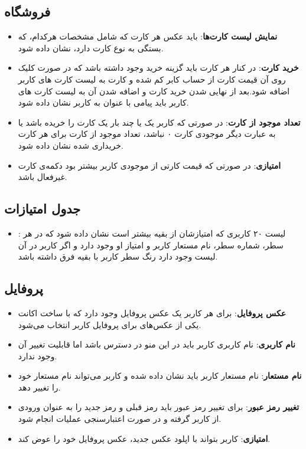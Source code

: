 \documentclass[]{article}
\begin{document}
\subsection*{{\titr فروشگاه}}

\begin{itemize}
    \item \textbf{نمایش لیست کارت‌ها}: باید عکس هر کارت که شامل مشخصات هر‌کدام، که بستگی به نوع کارت دارد، نشان داده شود.
    \item \textbf{خرید کارت}: در کنار هر کارت باید گزینه خرید وجود داشته باشد که در صورت کلیک روی آن قیمت کارت از حساب کابر کم شده و کارت به لیست کارت های کاربر اضافه شود.بعد از نهایی شدن خرید کارت و اضافه شدن آن به لیست کارت های کاربر باید پیامی با عنوان   به کاربر نشان داده شود.
    \item \textbf{تعداد موجود از کارت}: در صورتی که کاربر یک یا چند بار یک کارت را خریده باشد یا به عبارت دیگر موجودی کارت ۰ نباشد، تعداد موجود از کارت برای هر کارت خریداری شده نشان داده شود.
    \item \textbf{امتیازی}: در صورتی که قیمت کارتی از موجودی کاربر بیشتر بود دکمه‌ی  کارت غیر‌فعال باشد.
\end{itemize}

\subsection*{{\titr جدول امتیازات}}

\begin{itemize}
    \item {}:  لیست ۲۰ کاربری که امتیازشان از بقیه بیشتر است نشان داده شود که در هر سطر، شماره سطر،  نام مستعار کاربر و امتیاز او وجود دارد و اگر کاربر در آن لیست وجود دارد رنگ سطر کاربر با بقیه فرق داشته باشد.
\end{itemize}


\subsection*{{\titr پروفایل}}
\begin{itemize}
    \item \textbf{عکس پروفایل}: برای هر کاربر یک عکس پروفایل وجود دارد که با ساخت اکانت یکی از عکس‌های  برای پروفایل کاربر انتخاب می‌شود.
    \item \textbf{نام کاربری}: نام کاربری کاربر باید در این منو در دسترس باشد اما قابلیت تغییر آن وجود ندارد.
    \item \textbf{نام مستعار}: نام مستعار کاربر باید نشان داده شده و کاربر می‌تواند نام مستعار خود را تغییر دهد.
    \item \textbf{تغییر رمز عبور}: برای تغییر رمز عبور باید رمز قبلی و رمز جدید را به عنوان ورودی از کاربر گرفته و در صورت اعتبارسنجی عملیات انجام شود.
    \item \textbf{امتیازی}: کاربر بتواند با اپلود عکس جدید، عکس پروفایل‌ خود را عوض کند.
\end{itemize}
\end{document}
